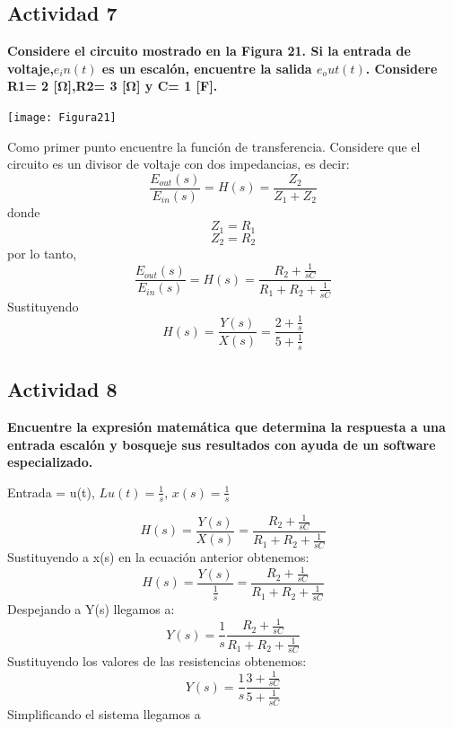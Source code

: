 \subsection{Actividad 7}
\noindent\textbf{Considere el circuito mostrado en la Figura 21. Si la entrada de voltaje,$e_in(t)$ es un escalón, encuentre la salida $e_out(t)$. Considere R1= 2 [Ω],R2= 3 [Ω] y C= 1 [F].}
	\begin{center}
		\texttt{[image: Figura21]}
	\end{center}
	\noindent Como primer punto encuentre la función de transferencia. Considere que el circuito es un divisor de voltaje con dos impedancias, es decir:
	\begin{equation}
		\frac{E_{out}(s)}{E_{in}(s)}=H(s)=\frac{Z_2}{Z_1+Z_2}
	\end{equation}
	donde
	\begin{equation}
		Z_1=R_1
	\end{equation}
	\begin{equation}
		Z_2=R_2
	\end{equation}
	por lo tanto, 
	\begin{equation}
		\frac{E_{out}(s)}{E_{in}(s)}=H(s)=\frac{R_2+\frac{1}{sC}}{R_1+R_2+\frac{1}{sC}}
	\end{equation}
	Sustituyendo
		\begin{equation}
H(s)=\frac{Y(s)}{X(s)}=\frac{2+\frac{1}{s}}{5+\frac{1}{s}}
	\end{equation}
	
\subsection{Actividad 8}
\textbf{Encuentre la expresión matemática que determina la respuesta a una entrada escalón y bosqueje sus resultados con ayuda de un software especializado.}

Entrada = u(t), $L{u(t)}=\frac{1}{s}$, $x(s)=\frac{1}{s}$

\begin{equation}
	H(s)=\frac{Y(s)}{X(s)}=\frac{R_2+\frac{1}{sC}}{R_1+R_2+\frac{1}{sC}}
\end{equation}
Sustituyendo a x(s) en la ecuación anterior obtenemos:
\begin{equation}
	H(s)=\frac{Y(s)}{\frac{1}{s}}=\frac{R_2+\frac{1}{sC}}{R_1+R_2+\frac{1}{sC}}
\end{equation}
Despejando a Y(s) llegamos a:
\begin{equation}
	Y(s)=\frac{1}{s}\frac{R_2+\frac{1}{sC}}{R_1+R_2+\frac{1}{sC}}
\end{equation}
Sustituyendo los valores de las resistencias obtenemos:
\begin{equation}
	Y(s)=\frac{1}{s}\frac{3+\frac{1}{sC}}{5+\frac{1}{sC}}
\end{equation}
Simplificando el sistema llegamos a

